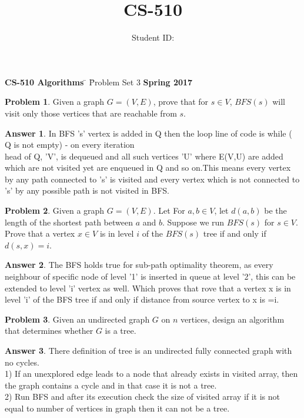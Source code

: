 \documentclass{article}
\title{CS-510 \hwNo}
\author{\myname \qquad Student ID: \myid}
\theoremstyle{definition}
\newtheorem{Q}{Problem}
\newtheorem{A}{Answer}
\begin{document}
\maketitle
\begin{tabbing}


{\bf CS-510 Algorithms}   \= \hskip1.4in \= Problem Set 3 \` {\bf Spring 2017} \kill 
\end{tabbing}
\begin{Q}
Given a graph $G=(V,E)$, prove that for $s\in V$, $BFS(s)$ will visit only those vertices that are reachable from $s$. 
\end{Q}
\begin{A}
In BFS 's' vertex is added in Q then the loop line of code is 
while ( Q is not empty) - on every iteration \\head of Q, 'V', is dequeued and all such vertices 'U' where E(V,U) are added which are not visited yet are enqueued in Q and so on.This means every vertex by any path connected to 's' is visited and every vertex which is not connected to 's' by any possible path is not visited in BFS.
\end{A}
\pagebreak
\begin{Q}
Given a graph $G=(V,E)$. Let For $a,b\in V$, let $d(a,b)$ be the length of the shortest path between $a$ and $b$. Suppose we run $BFS(s)$ for $s\in V$. Prove that a vertex $x\in V$ is in level $i$ of the $BFS(s)$ tree if and only if $d(s,x)=i$.
\end{Q}
\begin{A}
The BFS holds true for sub-path optimality theorem, as every neighbour of specific node of level '1' is inserted in queue at level '2', this can be extended to level 'i' vertex as well. Which proves that rove that a vertex x is in level 'i' of the BFS tree if and only if distance from source vertex to x is =i.
\end{A}
\pagebreak
\begin{Q}
Given an undirected graph $G$ on $n$ vertices, design an algorithm that determines whether $G$ is a tree.
\end{Q}
\begin{A}
There definition of tree is an undirected fully connected graph with no cycles.\\
  1) If an unexplored edge leads to a node that already exists in visited array, then the graph contains a cycle and in that case it is not a tree. \\
2) Run BFS and after its execution check the size of visited array if it is not equal to number of vertices in graph then it can not be a tree.
\end{A}
\end{document}
